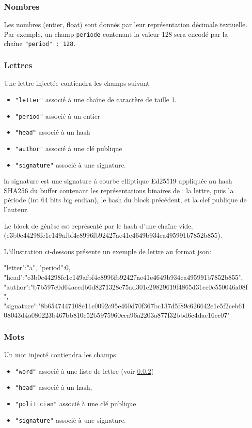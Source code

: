 \documentclass{article}
\begin{document}
 \subsubsection{Nombres}
 \label{sec:enc-nombres}

 Les nombres (entier, float) sont donnés par leur représentation
 décimale textuelle. Par exemple, un champ \texttt{periode} contenant
 la valeur 128 sera encodé par la chaîne \texttt{"period" : 128}.

 \subsubsection{Lettres}
 \label{sec:enc-lettres}
 Une lettre injectée contiendra les champs suivant
 \begin{itemize}
 \item \texttt{"letter"} associé à une chaîne de caractère de taille
   1.
 \item \texttt{"period"} associé à un entier
 \item \texttt{"head"} associé à un hash
 \item \texttt{"author"} associé à une clé publique
 \item \texttt{"signature"} associé à une signature.
 \end{itemize}
 la signature est une signature à courbe elliptique Ed25519 appliquée
 au hash SHA256 du buffer contenant les représentations binaires de :
 la lettre, puis la période (int 64 bits big endian), le hash du block
 précédent, et la clef publique de l'auteur.

 Le block de génèse est représenté par le hash d'une chaîne vide,
 (e3b0c44298fc1c149afbf4c8996fb92427ae41e4649b934ca495991b7852b855).

 L'illustration ci-dessous présente un exemple de
 lettre au format json:

\begin{jsonMessage}
   { "letter":"a", "period":0,
     "head":"e3b0c44298fc1c149afbf4c8996fb92427ae41e4649b934ca495991b7852b855",
     "author":"b7b597e0d64accdb6d8271328c75ad301c29829619f4865d31cc0c550046a08f",
     "signature":"8b6547447108e11c0092c95e460d70f367bc137d5f89c626642e1e5f2ceb6108043d4a080223b467bb810c52b5975960eea96a2203a877f32bbd6c4dac16ec07"
   }
\end{jsonMessage}

 \subsubsection{Mots}
 \label{sec:enc-mots}
 Un mot injecté contiendra les champs
 \begin{itemize}
 \item \texttt{"word"} associé à une liste de lettre (voir
   \ref{sec:enc-lettres})
 \item \texttt{"head"} associé à un hash,
 \item \texttt{"politician"} associé à une clé publique
 \item \texttt{"signature"} associé à une signature.
 \end{itemize}
\end{document}
